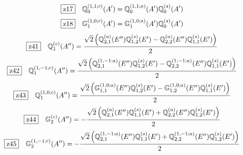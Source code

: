 \documentclass[fleqn,10pt,landscape]{jsarticle}
\begin{document}
\begin{dmath*}
\hspace*{3mm}\fbox{z17}\quad \mathbb{Q}_{0}^{(1,1;c)}(A^{\prime})=\mathbb{Q}_{0}^{(1,1;a)}(A^{\prime}) \mathbb{Q}_{0}^{(s)}(A^{\prime})
\end{dmath*}
\begin{dmath*}
\hspace*{3mm}\fbox{z18}\quad \mathbb{G}_{1}^{(1,0;c)}(A^{\prime})=\mathbb{G}_{1}^{(1,0;a)}(A^{\prime}) \mathbb{Q}_{0}^{(s)}(A^{\prime})
\end{dmath*}
\begin{dmath*}
\hspace*{3mm}\fbox{z41}\quad \mathbb{Q}_{1}^{(c)}(A^{\prime\prime})=\frac{\sqrt{2} \left(\mathbb{Q}_{2,1}^{(a)}(E^{\prime\prime}) \mathbb{Q}_{1,2}^{(s)}(E^{\prime}) - \mathbb{Q}_{2,2}^{(a)}(E^{\prime\prime}) \mathbb{Q}_{1,1}^{(s)}(E^{\prime})\right)}{2}
\end{dmath*}
\begin{dmath*}
\hspace*{3mm}\fbox{z42}\quad \mathbb{Q}_{1}^{(1,-1;c)}(A^{\prime\prime})=\frac{\sqrt{2} \left(\mathbb{Q}_{2,1}^{(1,-1;a)}(E^{\prime\prime}) \mathbb{Q}_{1,2}^{(s)}(E^{\prime}) - \mathbb{Q}_{2,2}^{(1,-1;a)}(E^{\prime\prime}) \mathbb{Q}_{1,1}^{(s)}(E^{\prime})\right)}{2}
\end{dmath*}
\begin{dmath*}
\hspace*{3mm}\fbox{z43}\quad \mathbb{Q}_{1}^{(1,0;c)}(A^{\prime\prime})=\frac{\sqrt{2} \left(\mathbb{G}_{1,1}^{(1,0;a)}(E^{\prime\prime}) \mathbb{Q}_{1,2}^{(s)}(E^{\prime}) - \mathbb{G}_{1,2}^{(1,0;a)}(E^{\prime\prime}) \mathbb{Q}_{1,1}^{(s)}(E^{\prime})\right)}{2}
\end{dmath*}
\begin{dmath*}
\hspace*{3mm}\fbox{z44}\quad \mathbb{G}_{2}^{(c)}(A^{\prime\prime})=- \frac{\sqrt{2} \left(\mathbb{Q}_{2,1}^{(a)}(E^{\prime\prime}) \mathbb{Q}_{1,1}^{(s)}(E^{\prime}) + \mathbb{Q}_{2,2}^{(a)}(E^{\prime\prime}) \mathbb{Q}_{1,2}^{(s)}(E^{\prime})\right)}{2}
\end{dmath*}
\begin{dmath*}
\hspace*{3mm}\fbox{z45}\quad \mathbb{G}_{2}^{(1,-1;c)}(A^{\prime\prime})=- \frac{\sqrt{2} \left(\mathbb{Q}_{2,1}^{(1,-1;a)}(E^{\prime\prime}) \mathbb{Q}_{1,1}^{(s)}(E^{\prime}) + \mathbb{Q}_{2,2}^{(1,-1;a)}(E^{\prime\prime}) \mathbb{Q}_{1,2}^{(s)}(E^{\prime})\right)}{2}
\end{dmath*}
\end{document}
